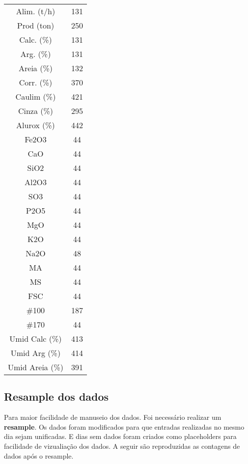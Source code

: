\newpage

\begin{center}
\begin{tabular}{ c c }
Alim. (t/h)       & 131\\
Prod (ton)        & 250\\
Calc. (\%)        & 131\\
Arg. (\%)         & 131\\
Areia (\%)        & 132\\
Corr. (\%)        & 370\\
Caulim (\%)       & 421\\
Cinza (\%)        & 295\\
Alurox (\%)       & 442\\
Fe2O3             & 44\\
CaO               & 44\\
SiO2              & 44\\
Al2O3             & 44\\
SO3               & 44\\
P2O5              & 44\\
MgO              &  44\\
K2O              &  44\\
Na2O             &  48\\
MA               &  44\\
MS               &  44\\
FSC              &  44\\
\#100             & 187\\
\#170             &  44\\
Umid Calc (\%)   &  413\\
Umid Arg (\%)    &  414 \\
Umid Areia (\%) &    391 \\
\end{tabular}
\end{center}




\subsection{Resample dos dados}
Para maior facilidade de manuseio dos dados. Foi necessário realizar um \textbf{resample}. Os dados foram modificados para que entradas realizadas no mesmo dia sejam unificadas. E dias sem dados foram criados como placeholders para facilidade de vizualiação dos dados. A seguir são reproduzidas as contagens de dados após o resample.


